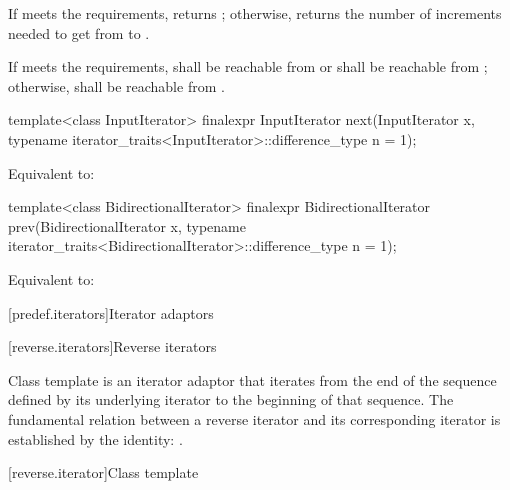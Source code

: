 \begin{itemdescr}
\pnum
\effects
If  meets the  requirements,
returns ; otherwise, returns
the number of increments needed to get from
to
.

\pnum
\requires
If  meets the  requirements,
 shall be reachable from  or  shall be
reachable from ; otherwise,
shall be reachable from
.
\end{itemdescr}

%
\begin{itemdecl}
template<class InputIterator>
  finalexpr InputIterator next(InputIterator x,
    typename iterator_traits<InputIterator>::difference_type n = 1);
\end{itemdecl}

\begin{itemdescr}
\pnum
\effects Equivalent to: 
\end{itemdescr}

%
\begin{itemdecl}
template<class BidirectionalIterator>
  finalexpr BidirectionalIterator prev(BidirectionalIterator x,
    typename iterator_traits<BidirectionalIterator>::difference_type n = 1);
\end{itemdecl}

\begin{itemdescr}
\pnum
\effects Equivalent to: 
\end{itemdescr}

[predef.iterators]{Iterator adaptors}

[reverse.iterators]{Reverse iterators}

\pnum
Class template  is an iterator adaptor that iterates from the end of the sequence defined by its underlying iterator to the beginning of that sequence.
The fundamental relation between a reverse iterator and its corresponding iterator
is established by the identity:
.

[reverse.iterator]{Class template }

